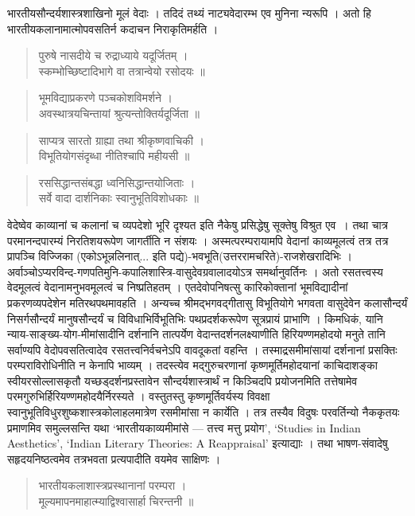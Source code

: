 {\dev भारतीयसौन्दर्यशास्त्रशाखिनो मूलं वेदाः । तदिदं तथ्यं नाट्यवेदारम्भ एव मुनिना न्यरूपि । अतो हि भारतीयकलानामात्मोपवसतिर्न कदाचन निराकृतिमर्हति ।}
\begin{quote}
{\dev पुरुषे नासदीये च रुद्राध्याये यदूर्जितम् ।}\\
{\dev स्कम्भोच्छिष्टादिभागे वा तत्रान्वेयो रसोदयः ॥}
\end{quote}
\begin{quote}
{\dev भूमविद्याप्रकरणे पञ्चकोशविमर्शने ।}\\
{\dev अवस्थात्रयचिन्तायां श्रुत्यन्तोक्तिर्यदूर्जिता ॥}
\end{quote}
\begin{quote}
{\dev साप्यत्र सारतो ग्राह्या तथा श्रीकृष्णवाचिकी ।}\\
{\dev विभूतियोगसंदृब्धा नीतिश्चापि महीयसी ॥}
\end{quote}
\begin{quote}
{\dev रससिद्धान्तसंबद्धा ध्वनिसिद्धान्तयोजिताः ।}\\
{\dev सर्वे वादा दार्शनिकाः स्वानुभूतिविशोधकाः ॥}
\end{quote}

{\dev वेदेष्वेव काव्यानां च कलानां च व्यपदेशो भूरि दृश्यत इति नैकेषु प्रसिद्धेषु सूक्तेषु विश्रुत एव~। तथा चात्र परमानन्दपारम्यं निरतिशयरूपेण जागर्तीति न संशयः । अस्मत्परम्परायामपि वेदानां काव्यमूलत्वं तत्र तत्र प्रापञ्चि विज्जिका (एकोऽभून्नलिनात्... इति पद्ये)-भवभूति(उत्तर\-रामचरिते)-राजशेखरादिभिः । अर्वाञ्चोऽप्यरविन्द-गणपतिमुनि-कपालिशास्त्रि-वासुदेव\-\-ग्रवालादयोऽत्र समर्थानुवर्तिनः । अतो रसतत्त्वस्य वेदमूलत्वं वेदानामनुभवमूलत्वं च निष्प्रतिहतम् ।  एतदेवोपनिषत्सु कारिकोक्तानां भूमविद्यादीनां प्रकरणव्यपदेशेन मतिरथपथ\-मावहति । अन्यच्च श्रीमद्भगवद्गीतासु विभूतियोगे भगवता वासुदेवेन कलासौन्दर्यं निसर्ग\-सौन्दर्यं मानुषसौन्दर्यं च विविधाभिर्विभूतिभिः पथप्रदर्शकरूपेण सूत्रप्रायं प्राभाणि । किमधिकं, यानि न्याय-साङ्ख्य-योग-मीमांसादीनि दर्शनानि तात्पर्येण वेदान्तदर्शनलक्ष्याणीति हिरियण्ण\-महोदयो मनुते तानि सर्वाण्यपि वेदोपवसतित्वादेव रसतत्त्वनिर्वचनेऽपि वावदूकतां वहन्ति । तस्माद्रसमीमांसायां दर्शनानां प्रसक्तिः परम्पराविरोधिनीति न केनापि भाव्यम् । तदस्त्येव मद्गुरुचरणानां कृष्णमूर्तिमहोदयानां काचिदाशङ्का स्वीयरसोल्लासकृतौ यच्छड्दर्शनप्रस्तावेन सौन्दर्यशास्त्रार्थं न किञ्चिदपि प्रयोजनमिति तत्तेषामेव परमगुरुभिर्हिरियण्णमहोदयैर्निरस्यते । वस्तुतस्तु कृष्णमूर्तिवर्यस्य विवक्षा स्वानुभूतिविधुरशुष्कशास्त्रकोलाहलमात्रेण रसमीमांसा न कार्येति । तत्र तस्यैव विदुषः परवर्तिन्यो नैककृतयः प्रमाणमिव समुल्लसन्ति यथा ‘भारतीय\-काव्यमीमांसे --- तत्त्व मत्तु प्रयोग’,} `Studies in Indian Aesthetics', `Indian Literary Theories: A Reappraisal' {\dev इत्याद्याः । तथा भाषण-संवादेषु सहृदयनिष्ठत्वमेव तत्रभवता प्रत्यपादीति वयमेव साक्षिणः ।}
\begin{quote}
{\dev भारतीयकलाशास्त्रप्रस्थानानां परम्परा ।}\\
{\dev मूल्यमापनमाहात्म्याद्विश्वासार्हा चिरन्तनी ॥}
\end{quote}


